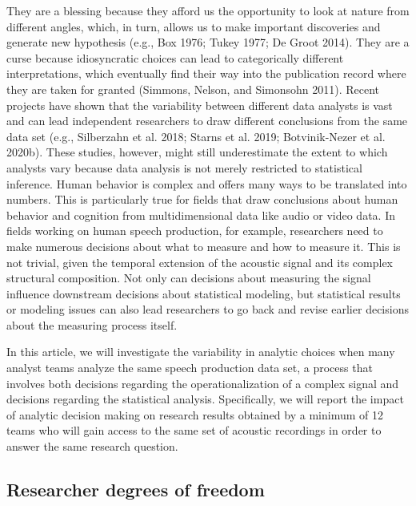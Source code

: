 \documentclass[
  12pt,
]{article}
\begin{document}
They are a blessing because they afford us the opportunity to look at nature from different angles, which, in turn, allows us to make important discoveries and generate new hypothesis (e.g., Box 1976; Tukey 1977; De Groot 2014).
They are a curse because idiosyncratic choices can lead to categorically different interpretations, which eventually find their way into the publication record where they are taken for granted (Simmons, Nelson, and Simonsohn 2011).
Recent projects have shown that the variability between different data analysts is vast and can lead independent researchers to draw different conclusions from the same data set (e.g., Silberzahn et al. 2018; Starns et al. 2019; Botvinik-Nezer et al. 2020b).
These studies, however, might still underestimate the extent to which analysts vary because data analysis is not merely restricted to statistical inference.
Human behavior is complex and offers many ways to be translated into numbers.
This is particularly true for fields that draw conclusions about human behavior and cognition from multidimensional data like audio or video data.
In fields working on human speech production, for example, researchers need to make numerous decisions about what to measure and how to measure it.
This is not trivial, given the temporal extension of the acoustic signal and its complex structural composition.
Not only can decisions about measuring the signal influence downstream decisions about statistical modeling, but statistical results or modeling issues can also lead researchers to go back and revise earlier decisions about the measuring process itself.

In this article, we will investigate the variability in analytic choices when many analyst teams analyze the same speech production data set, a process that involves both decisions regarding the operationalization of a complex signal and decisions regarding the statistical analysis.
Specifically, we will report the impact of analytic decision making on research results obtained by a minimum of 12 teams who will gain access to the same set of acoustic recordings in order to answer the same research question.

\hypertarget{researcher-degrees-of-freedom}{%
\subsection{Researcher degrees of freedom}\label{researcher-degrees-of-freedom}}
\end{document}
